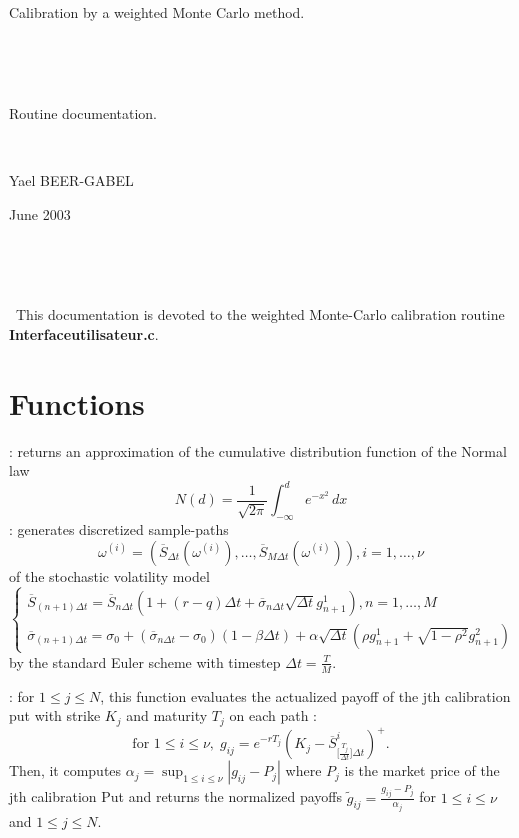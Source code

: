 \documentclass[a4paper,11pt]{article}
\begin{document}
\pagestyle{empty}
\begin{center}
{\Large Calibration by a weighted Monte Carlo method. }

\



\

\Large Routine documentation.

\

\Large Yael BEER-GABEL

\Large June 2003
\end{center}

\

\

\begin{flushleft}

\
This documentation is devoted to the weighted Monte-Carlo calibration routine
{\bf Interfaceutilisateur.c}. 





\section*{Functions}


: returns an approximation of the
cumulative distribution function of the Normal law
$$N(d)=\frac{1}{\sqrt{2\pi}}\int_{-\infty}^{d}e^{-x^{2}}\,dx$$
\vspace{0.5 cm}
 : generates discretized
sample-paths
$$\omega^{(i)}=(\overline{S}_{\Delta
t}(\omega^{(i)}),\hdots,\overline{S}_{M \Delta t}(\omega^{(i)})) ,
i=1,\hdots,\nu$$ of the stochastic volatility model
\begin{equation*}
\begin{cases}
\overline{S}_{(n+1)\Delta t} =  \overline{S}_{n\Delta
t}(1+(r-q)\Delta t +\overline{\sigma}_{n\Delta
  t}\sqrt{\Delta t}g^1_{n+1}) , n=1,\hdots,M\\
\overline{\sigma}_{(n+1)\Delta t}= \sigma_0+
(\overline{\sigma}_{n\Delta t}-\sigma_0)(1- \beta \Delta t)+
\alpha \sqrt{\Delta t}(\rho g^1_{n+1}+\sqrt{1-\rho^2} g^2_{n+1})
\end{cases}
\end{equation*}by the standard Euler scheme with
timestep $\Delta t=\frac {T}{M}$.

\vspace{0.5 cm}

: for $ 1 \leq j \leq N$, this function evaluates
the actualized payoff of the jth calibration put with strike $K_j$
and maturity $T_j$ on each path : $$ \mbox{for }1\leq i\leq \nu,\;g_{ij}=e^{-rT_j}\left(K_{j}-
\overline{S}_{\big[\frac{T_j}{\Delta t}\big]\Delta t}^{i}\right)^{+}.$$ Then, it
computes $\alpha_j=\sup_{1 \leq i
  \leq \nu}|g_{ij}-P_j|$ where $P_j$ is the market price of the jth calibration Put and returns the normalized payoffs
  $\tilde{g}_{ij}=\frac{g_{ij}-P_j}{\alpha_j}$ for $ 1 \leq i \leq \nu$ and $1\leq j \leq N$.


\end{flushleft}
\end{document}
